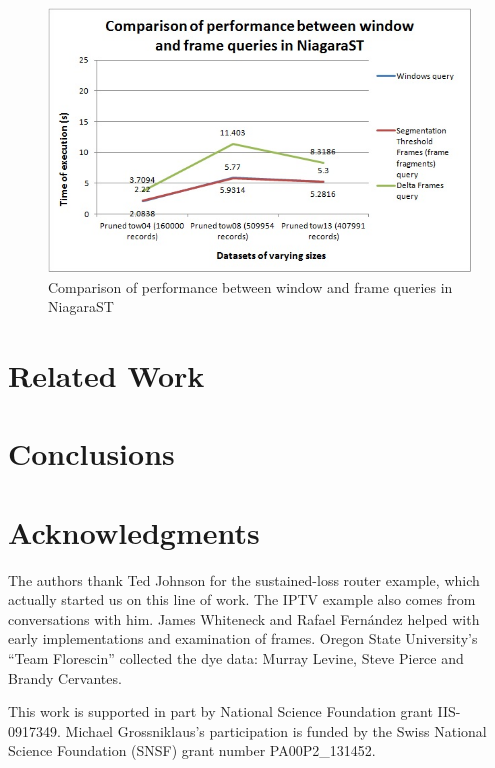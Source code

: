 \documentclass{vldb}
\newcommand{\dquote}[1]{``#1''}
\begin{document}
\begin{figure}[htb]
   \centering
   \includegraphics[width=.99\columnwidth]{figures/performance_analysis}
   \caption{Comparison of performance between window and frame queries in NiagaraST}
   \label{fig:eval-performance-analysis}
\end{figure}


\section{Related Work}
\label{sec:relatedwork}

\section{Conclusions}
\label{sec:conclusion}

\balance

\section{Acknowledgments}
The authors thank Ted Johnson for the sustained-loss router example, which actually started us on this line of work. The IPTV example also comes from conversations with him. James Whiteneck and Rafael Fern{\'a}ndez helped with early implementations and examination of frames. Oregon State University’s \dquote{Team Florescin} collected the dye data: Murray Levine, Steve Pierce and Brandy Cervantes.

This work is supported in part by National Science Foundation grant IIS-0917349. Michael Grossniklaus's participation is funded by the Swiss National Science Foundation (SNSF) grant number PA00P2\_131452.

\end{document}
